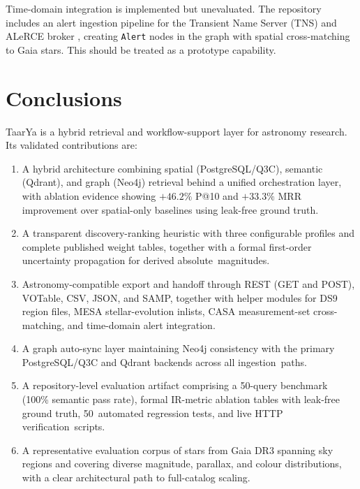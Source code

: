 \documentclass[preprint,12pt,authoryear]{elsarticle}
\begin{document}
Time-domain integration is implemented but unevaluated. The repository includes an alert ingestion pipeline for the Transient Name Server (TNS) and ALeRCE broker \citep{Forster2021}, creating \texttt{Alert} nodes in the graph with spatial cross-matching to Gaia stars. This should be treated as a prototype capability.

\section{Conclusions}
\label{sec:conclusions}

\textsf{TaarYa} is a hybrid retrieval and workflow-support layer for astronomy research. Its validated contributions are:

\begin{enumerate}
    \item A hybrid architecture combining spatial (PostgreSQL/Q3C), semantic (Qdrant), and graph (Neo4j) retrieval behind a unified orchestration layer, with ablation evidence showing $+46.2\%$ P@10 and $+33.3\%$ MRR improvement over spatial-only baselines using leak-free ground truth.
    \item A transparent discovery-ranking heuristic with three configurable profiles and complete published weight tables, together with a formal first-order uncertainty propagation for derived absolute~magnitudes.
    \item Astronomy-compatible export and handoff through REST (GET and POST), VOTable, CSV, JSON, and SAMP, together with helper modules for DS9 region files, MESA stellar-evolution inlists, CASA measurement-set cross-matching, and time-domain alert integration.
    \item A graph auto-sync layer maintaining Neo4j consistency with the primary PostgreSQL/Q3C and Qdrant backends across all ingestion~paths.
    \item A repository-level evaluation artifact comprising a 50-query benchmark (100\% semantic pass rate), formal IR-metric ablation tables with leak-free ground truth, 50~automated regression tests, and live HTTP verification~scripts.
    \item A representative evaluation corpus of \nStarsReal{} stars from Gaia DR3 spanning \nClusterNodes{} sky regions and covering diverse magnitude, parallax, and colour distributions, with a clear architectural path to full-catalog scaling.
\end{enumerate}
\end{document}
